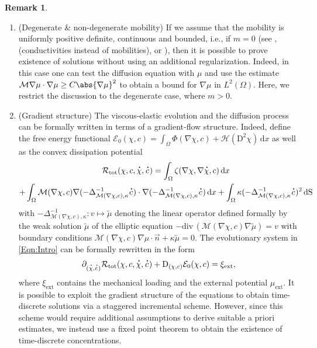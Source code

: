 \documentclass[a4paper,12pt]{article}
\newcommand{\calM}{\mathcal{M}}
\newcommand{\pl}{\partial}
\newcommand{\DIV}{\mathrm{div\,}}
\newcommand{\dd}{\mathrm{\,d}}
\newcommand\DT[1]{\mathchoice
                 {{\buildrel{\hspace*{.1em}\text{\LARGE.}}\over{#1}}}
                 {{\buildrel{\hspace*{.1em}\text{\Large.}}\over{#1}}}
                 {{\buildrel{\hspace*{.1em}\text{\large.}}\over{#1}}}
                 {{\buildrel{\hspace*{.1em}\text{\large.}}\over{#1}}}}
\renewcommand{\dot}{\DT}
\newcommand{\calE}{\mathcal{E}}
\newcommand{\calR}{\mathcal{R}}
\newcommand{\rmD}{\mathrm{D}}
\theoremstyle{plain}
\theoremstyle{definition}
\newtheorem{Rem}[Th]{Remark}
\numberwithin{equation}{section}
\begin{document}
\begin{Rem}
\begin{enumerate}[label=(\roman*),ref=\theRem(\roman*)]
    \item(Degenerate \& non-degenerate mobility)
		If we assume that the mobility is uniformly positive definite, continuous and bounded, i.e., if $m=0$ (see \cite{Roub2017VMSS}, \cite{MieRou2020TVKVR} (conductivities instead of mobilities), or \cite{RouTom2020DCEB}), then it is possible to prove existence of solutions without using an additional regularization. Indeed, in this case one can test the diffusion equation with $\mu$ and use the estimate $\calM \nabla\mu\cdot\nabla\mu \geq C\abs{\nabla\mu}^2$ to obtain a bound for $\nabla\mu$ in $L^2(\Omega)$. Here, we restrict the discussion to the degenerate case, where $m>0$. %

    \item(Gradient structure) The viscous-elastic evolution and the diffusion process can be formally written
in terms of a gradient-flow structure. Indeed, define the free energy functional
$\calE_0(\chi,c) = \int_{\Omega}\Phi(\nabla\chi,c)+\mathscr{H}(\rmD^2\chi)\dd x$
as well as the convex dissipation potential
\begin{multline*}
\calR_\text{tot}(\chi,c,\dot\chi,\dot c)
= \int_\Omega \zeta(\nabla\chi,\nabla\dot \chi,c)\dd x \\+ \int_\Omega \calM(\nabla\chi,c)\nabla({-}\Delta_{\calM(\nabla\chi,c),\kappa}^{-1}\dot c)\cdot \nabla({-}\Delta_{\calM(\nabla\chi,c),\kappa}^{-1}\dot c)\dd x + \int_\Omega \kappa ({-}\Delta_{\calM(\nabla\chi,c),\kappa}^{-1}\dot c)^2 \dd\mathrm{S}
\end{multline*}
with $-\Delta_{\calM(\nabla\chi,c),\kappa}^{-1} : v \mapsto \tilde\mu$ denoting the linear operator defined formally by the weak solution $\tilde\mu$ of the elliptic equation $-\DIV(\calM(\nabla\chi,c)\nabla \tilde\mu)=v$
with boundary conditions $\calM(\nabla\chi,c)\nabla\mu\cdot\Vec{n} + \kappa\tilde\mu=0$. The evolutionary system in \eqref{Eqn:Intro} can be formally rewritten in the form
\[
\pl_{(\dot\chi,\dot c)}\calR_\text{tot}(\chi,c,\dot\chi,\dot c) + \rmD_{(\chi,c)}\calE_0(\chi,c) =  \xi_\text{ext},	
\]
where $\xi_\text{ext}$ contains the mechanical loading and the
external potential $\mu_\text{ext}$. It is possible to exploit the gradient 
structure of the equations to obtain time-discrete solutions via a staggered incremental scheme. However, since this scheme would require additional assumptions to derive suitable a priori estimates, we instead use a fixed point theorem to obtain the existence of time-discrete concentrations.
\end{enumerate}
\end{Rem}
\end{document}
